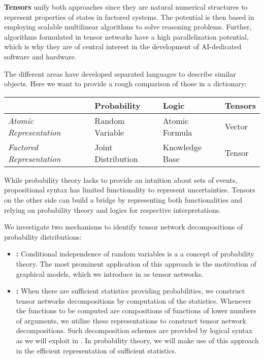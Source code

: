 \textbf{Tensors} unify both approaches since they are natural numerical structures to represent properties of states in factored systems.
The potential is then based in employing scalable multilinear algorithms to solve reasoning problems.
Further, algorithms formulated in tensor networks have a high parallelization potential, which is why they are of central interest in the development of AI-dedicated software and hardware.

The different areas have developed separated languages to describe similar objects.
Here we want to provide a rough comparison of those in a dictionary:

\begin{tabular}{|p{\threecolumnwidth}|p{\fourcolumnwidth}|p{\fourcolumnwidth}|p{\fourcolumnwidth}|} %
    \hline
    & \textbf{Probability} & \textbf{Logic} & \textbf{Tensors}   \\
    \hline
    \textit{Atomic Representation}        & Random Variable             & Atomic Formula               & Vector             \\
    \textit{Factored Representation}      & Joint Distribution          & Knowledge Base               & Tensor             \\
    \hline
\end{tabular}

While probability theory lacks to provide an intuition about sets of events, propositional syntax has limited functionality to represent uncertainties.
Tensors on the other side can build a bridge by representing both functionalities and relying on probability theory and logics for respective interpretations.


We investigate two mechanisms to identify tensor network decompositions of probability distributions:
\begin{itemize}
    \item \textbf{\IndependenceMechanism{}:} Conditional independence of random variables is a a concept of probability theory.
       The most prominent application of this approach is the motivation of graphical models, which we introduce in  as tensor networks.
    \item \textbf{\ComputationMechanism{}:} When there are sufficient statistics providing probabilities, we construct tensor networks decompositions by computation of the statistics.
        Whenever the functions to be computed are compositions of functions of lower numbers of arguments, we utilize these representations to construct tensor network decompositions.
        Such decomposition schemes are provided by logical syntax as we will exploit in .
        In probability theory, we will make use of this approach in the efficient representation of sufficient statistics.
\end{itemize}
